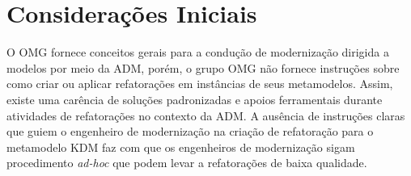 \section{Considerações Iniciais}

O OMG fornece conceitos gerais para a condução de modernização dirigida a modelos por meio da ADM, porém, o grupo OMG não fornece instruções sobre como criar ou aplicar refatorações em instâncias de seus metamodelos. %
Assim, existe uma carência de soluções padronizadas e apoios ferramentais durante atividades de refatorações no contexto da ADM. A ausência de instruções claras que guiem o engenheiro de modernização na criação de refatoração para o metamodelo KDM faz com que os engenheiros de modernização sigam procedimento \textit{ad-hoc} que podem levar a refatorações de baixa qualidade.





